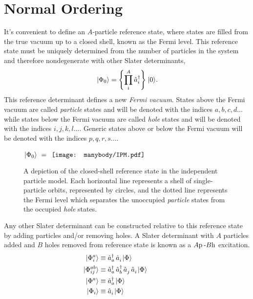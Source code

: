 \documentclass[thesis.tex]{subfiles}
\begin{document}
\section{Normal Ordering}
It's convenient to define an $A$-particle reference state, where states are filled from the true vacuum up to a closed shell, known as the Fermi level.  This reference state must be uniquely determined from the number of particles in the system and therefore nondegenerate with other Slater determinants,
\begin{equation}
  \hspace{1pt}\lvert \Phi_{0} \rangle = \left\{\prod_{i}^{A}\mathop{\hat{a}^{\dagger}_{i}}\right\}\hspace{1pt}\lvert 0 \rangle.
\end{equation}
This reference determinant defines a new \textit{Fermi vacuum}. States above the Fermi vacuum are called \textit{particle} states and will be denoted with the indices $a,b,c,d...$ while states below the Fermi vacuum are called \textit{hole} states and will be denoted with the indices $i,j,k,l...$. Generic states above or below the Fermi vacuum will be denoted with the indices $p,q,r,s...$.

\begin{figure}
  \centering
  \mbox{{\large $\hspace{1pt}\lvert \Phi_{0} \rangle\ =\ $}} $\vcenter{\hbox{\texttt{[image: manybody/IPM.pdf]}}}$
  \caption{A depiction of the closed-shell reference state in the independent particle model.  Each horizontal line represents a shell of single-particle orbits, represented by circles, and the dotted line represents the Fermi level which separates the unoccupied \textit{particle} states from the occupied \textit{hole} states.}
  \label{fig:reference_state}
\end{figure}

Any other Slater determinant can be constructed relative to this reference state by adding particles and/or removing holes.  A Slater determinant with $A$ particles added and $B$ holes removed from reference state is known as a $A\mathrm{p}\hspace{2pt}\text{-}B\mathrm{h}$ excitation.
\begin{align} \label{eq:ket_states}
  \hspace{1pt}\lvert \Phi^{a}_{i} \rangle &\equiv \mathop{\hat{a}^{\dagger}_{a}}\mathop{\hat{a}^{}_{i}}\hspace{1pt}\lvert \Phi \rangle \hspace{2cm} \notag \\
  \hspace{1pt}\lvert \Phi^{ab}_{ij} \rangle &\equiv \mathop{\hat{a}^{\dagger}_{a}}\mathop{\hat{a}^{\dagger}_{b}}\mathop{\hat{a}^{}_{j}}\mathop{\hat{a}^{}_{i}}\hspace{1pt}\lvert \Phi \rangle \notag \\
  \hspace{1pt}\lvert \Phi^{a} \rangle &\equiv \mathop{\hat{a}^{\dagger}_{a}}\hspace{1pt}\lvert \Phi \rangle \notag \\
  \hspace{1pt}\lvert \Phi_{i} \rangle &\equiv \mathop{\hat{a}^{}_{i}}\hspace{1pt}\lvert \Phi \rangle
\end{align}
\end{document}
